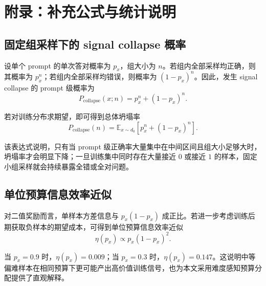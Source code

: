 \chapter{附录：补充公式与统计说明}

\section{固定组采样下的 signal collapse 概率}

设单个 prompt 的单次答对概率为 $p_x$，组大小为 $n$。若组内全部采样均正确，则其概率为 $p_x^n$；若组内全部采样均错误，则概率为 $(1-p_x)^n$。因此，发生 signal collapse 的 prompt 级概率为
\begin{equation}
    P_{\mathrm{collapse}}(x;n)=p_x^n+(1-p_x)^n.
\end{equation}

若对训练分布求期望，即可得到总体坍塌率
\begin{equation}
    P_{\mathrm{collapse}}(n)=\mathbb{E}_{x\sim d_0}[p_x^n+(1-p_x)^n].
\end{equation}

该表达式说明，只有当 prompt 级正确率大量集中在中间区间且组大小足够大时，坍塌率才会明显下降；一旦训练集中同时存在大量接近 $0$ 或接近 $1$ 的样本，固定小组采样就会持续暴露全错或全对问题。

\section{单位预算信息效率近似}

对二值奖励而言，单样本方差信息与 $p_x(1-p_x)$ 成正比。若进一步考虑训练后期获取负样本的期望成本，可得到单位预算信息效率近似
\begin{equation}
    \eta(p_x)\propto p_x(1-p_x)^2.
\end{equation}

当 $p_x=0.9$ 时，$\eta(p_x)=0.009$；当 $p_x=0.3$ 时，$\eta(p_x)=0.147$。这说明中等偏难样本在相同预算下更可能产出高价值训练信号，也为本文采用难度感知预算分配提供了直观解释。
